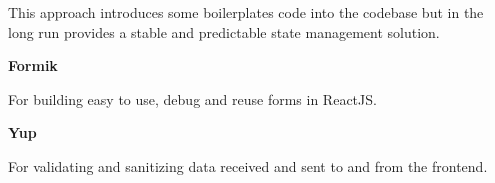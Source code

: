 This approach introduces some boilerplates code into the codebase but in the long run provides a stable and predictable state management solution.


\hspace{5mm}


\textbf{Formik}

For building easy to use, debug and reuse forms in ReactJS.


\hspace{5mm}


\textbf{Yup}

For validating and sanitizing data received and sent to and from the frontend.


\hspace{5mm}


\newpage
